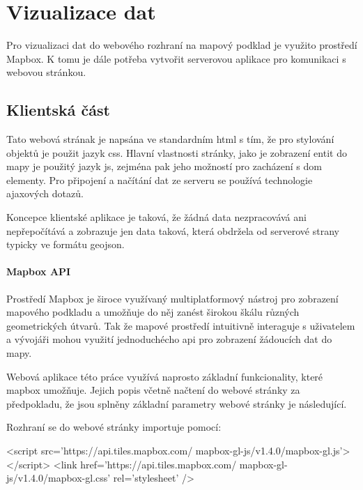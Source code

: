 
\chapter{Vizualizace dat}

Pro vizualizaci dat do webového rozhraní na mapový podklad je využito prostředí Mapbox. K tomu je dále potřeba vytvořit serverovou aplikace pro komunikaci s webovou stránkou.

\section{Klientská část}

Tato webová strának je napsána ve standardním \gls{html} s tím, že pro stylování objektů je použit jazyk \gls{css}. Hlavní vlastnosti stránky, jako je zobrazení entit do mapy je použitý jazyk \gls{js}, zejména pak jeho možností pro zacházení s \gls{dom} elementy. Pro připojení a načítání dat ze serveru se používá technologie \gls{ajax}ových dotazů.

\bigbreak

Koncepce klientské aplikace je taková, že žádná data nezpracovává ani nepřepočítává a zobrazuje jen data taková, která obdržela od serverové strany typicky ve formátu \gls{geojson}.

\subsubsection{Mapbox API}

Prostředí Mapbox je široce využívaný multiplatformový nástroj pro zobrazení mapového podkladu a umožňuje do něj zanést širokou škálu různých geometrických útvarů. Tak že mapové prostředí intuitivně interaguje s uživatelem a vývojáři mohou využití jednoduchécho \gls{api} pro zobrazení žádoucích dat do mapy.

\bigbreak

Webová aplikace této práce využívá naprosto základní funkcionality, které mapbox umožňuje. Jejich popis včetně načtení do webové stránky za předpokladu, že jsou splněny základní parametry webové stránky je následující.

\bigbreak

Rozhraní se do webové stránky importuje pomocí:
\begin{code}[frame=none]
<script src='https://api.tiles.mapbox.com/
	mapbox-gl-js/v1.4.0/mapbox-gl.js'></script>
<link href='https://api.tiles.mapbox.com/
	mapbox-gl-js/v1.4.0/mapbox-gl.css' rel='stylesheet' />
\end{code}

